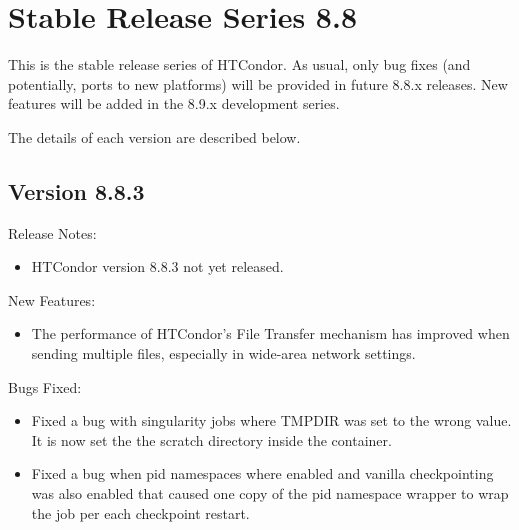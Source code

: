 
\section{Stable Release Series 8.8}\label{sec:History-8-8}

This is the stable release series of HTCondor.
As usual, only bug fixes (and potentially, ports to new platforms)
will be provided in future 8.8.x releases.
New features will be added in the 8.9.x development series.

The details of each version are described below.

\subsection*{\label{sec:New-8-8-3}Version 8.8.3}

\noindent Release Notes:

\begin{itemize}

\item HTCondor version 8.8.3 not yet released.

\end{itemize}


\noindent New Features:

\begin{itemize}

\item The performance of HTCondor's File Transfer mechanism has improved when
       sending multiple files, especially in wide-area network settings.

\end{itemize}

\noindent Bugs Fixed:

\begin{itemize}

\item Fixed a bug with singularity jobs where TMPDIR was set to the wrong
value.  It is now set the the scratch directory inside the container.

\item Fixed a bug when pid namespaces where enabled and vanilla checkpointing
was also enabled that caused one copy of the pid namespace wrapper to wrap
the job per each checkpoint restart.

\end{itemize}


